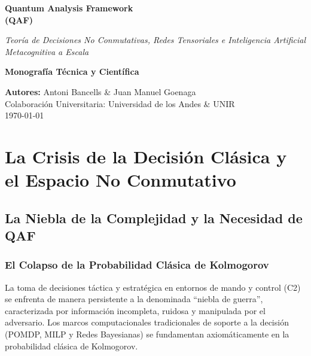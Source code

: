 \documentclass[11pt,a4paper,oneside]{report}
\begin{document}
\begin{titlepage}
    \centering
    \vspace*{2cm}
    
    {\Huge \bfseries \color{navy} Quantum Analysis Framework\\[0.5em] (QAF)}
    
    \vspace{1.5cm}
    {\Large \itshape Teoría de Decisiones No Conmutativas, Redes Tensoriales e Inteligencia Artificial Metacognitiva a Escala}
    
    \vspace{2.5cm}
    \begin{tcolorbox}[colback=lightgray,colframe=navy,arc=3mm,width=0.85\textwidth,halign=center]
        \Large \bfseries Monografía Técnica y Científica
    \end{tcolorbox}
    
    \vfill
    
    {\large \textbf{Autores:} Antoni Bancells \& Juan Manuel Goenaga}\\[0.5em]
    {\small Colaboración Universitaria: Universidad de los Andes \& UNIR}\\[2cm]
    
    {\small \today}
\end{titlepage}

\tableofcontents
\clearpage

\part{La Crisis de la Decisión Clásica y el Espacio No Conmutativo}

\chapter{La Niebla de la Complejidad y la Necesidad de QAF}
\label{cap:introduccion}

\section{El Colapso de la Probabilidad Clásica de Kolmogorov}
La toma de decisiones táctica y estratégica en entornos de mando y control (C2) se enfrenta de manera persistente a la denominada ``niebla de guerra'', caracterizada por información incompleta, ruidosa y manipulada por el adversario. Los marcos computacionales tradicionales de soporte a la decisión (POMDP, MILP y Redes Bayesianas) se fundamentan axiomáticamente en la probabilidad clásica de Kolmogorov.
\end{document}
